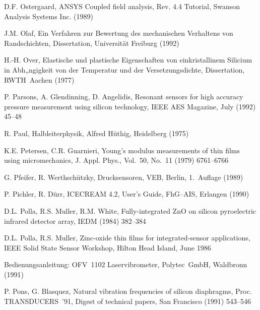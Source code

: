 \begin{thebibliography}{xxx}
 D.F. Ostergaard, {\sf ANSYS} Coupled field analysis, Rev. 4.4 Tutorial,
 Swanson Analysis Systems Inc. (1989)

 J.M. Olaf, Ein Verfahren zur Bewertung des mechanischen Verhaltens von
 Randschichten, Dissertation, Universität Freiburg (1992)

 H.-H. Over, Elastische und plastische Eigenschaften von einkristallinem
 Silicium in Abh„ngigkeit von der Temperatur und der Versetzungsdichte,
 Dissertation, RWTH~Aachen (1977)

 P. Parsons, A. Glendinning, D. Angelidis, Resonant sensors for high accuracy
 pressure measurement using silicon technology, IEEE AES Magazine,
 July (1992) 45--48

 R. Paul, Halbleiterphysik, Alfred Hüthig, Heidelberg (1975)


 K.E. Petersen, C.R. Guarnieri, Young's modulus measurements of thin films
 using micromechanics, J. Appl. Phys., Vol.~50, No.~11 (1979) 6761--6766


 G. Pfeifer, R. Werthschützky, Drucksensoren, VEB, Berlin,
 1.~Auflage (1989)

 P. Pichler, R. Dürr, {\sf ICECREAM} 4.2, User's Guide, FhG--AIS,
 Erlangen (1990)

 D.L. Polla, R.S. Muller, R.M. White, Fully-integrated ZnO on silicon
 pyroelectric infrared detector array, IEDM (1984) 382--384

 D.L. Polla, R.S. Muller, Zinc-oxide thin films for integrated-sensor
 applications, IEEE Solid State Sensor Workshop, Hilton Head Island,
 June 1986

 Bedienungsanleitung: OFV~1102 Laservibrometer, Polytec~GmbH,
 Waldbronn (1991)

 P. Pons, G. Blasquez, Natural vibration frequencies of silicon diaphragms,
 Proc. TRANSDUCERS~'91, Digest of technical papers, San Francisco
 (1991) 543--546


\end{thebibliography}
